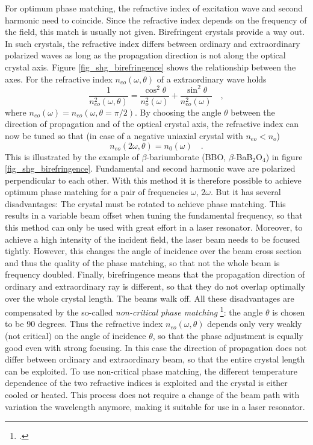 For optimum phase matching, the refractive index of
excitation wave and second harmonic need to coincide. Since the
refractive index  depends on the frequency of the field, this
match is  usually not given. 
Birefringent crystals provide a way out. In such crystals, the refractive index differs  
 between ordinary and extraordinary
polarized waves as long as the propagation direction is not along the
optical crystal axis. Figure
\ref{fig_shg_birefringence} shows the relationship between
the axes. For the refractive index $n_{eo}(\omega, \theta)$ of a
extraordinary wave holds
\begin{equation}
  \frac{1}{n_{eo}^2(\omega, \theta)} = \frac{\cos^2
  \theta}{n_{o}^2(\omega)}+ \frac{\sin^2 \theta}{n_{eo}^2(\omega)} \quad
  ,
\end{equation}
where $n_{eo}(\omega) = n_{eo}(\omega, \theta = \pi/2)$. 
By choosing the 
angle $\theta$ between the direction of propagation and
of the optical crystal axis, the refractive index can now be tuned
so that (in case of a negative uniaxial crystal with
$n_{eo} < n_o$)
\begin{equation}
  n_{eo}(2 \omega, \theta) = n_0(\omega) \quad.
\end{equation}
This is illustrated by the example of $\beta$-bariumborate (BBO,
$\beta$-BaB$_2$O$_4$) in figure
\ref{fig_shg_birefringence}. Fundamental  and
second harmonic  wave are polarized perpendicular to each other. With
this method it is therefore possible to achieve optimum phase matching for
a pair of frequencies $\omega$, $2\omega$. But it 
has several disadvantages: The crystal must be rotated
to achieve phase matching. This results in a variable beam
offset
when tuning the fundamental frequency, so that this method can only be used with great effort in a laser
resonator. Moreover, to achieve a high intensity of the incident field, the laser beam
needs to be focused tightly. However, this changes the angle of incidence over
the beam cross section and thus the quality of the
phase matching, so that not the whole beam is frequency doubled. Finally, birefringence means that the propagation direction of  ordinary and  extraordinary ray is different, so that they do not overlap optimally over the whole crystal length. The beams walk off.
All these disadvantages are compensated by
the so-called \emph{non-critical phase matching}
\footcite{Demtroeder_laser,Hopf86}:
the angle $\theta$ is chosen to be 90 degrees. Thus the
refractive index $n_{eo}(\omega, \theta)$ depends only very weakly
(not critical) on the angle of incidence $\theta$, so that
the phase adjustment is equally good even with strong focusing. In this case
the direction of propagation does not differ between ordinary and
extraordinary beam, so that the entire crystal length
can be exploited. To use  non-critical
phase matching, the different
temperature dependence of the two refractive indices is exploited  and
the crystal is either cooled or heated. This process
does not require a change of the beam path with variation
the wavelength anymore, making it suitable for use in a
laser resonator.

